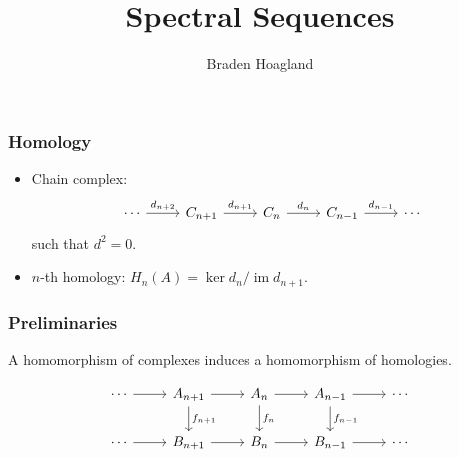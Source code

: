\documentclass{beamer}
\title{Spectral Sequences}
\author{Braden Hoagland}
\institute{Math 502: Algebraic Structures II}
\date{}
\DeclareMathOperator{\im}{im}
\begin{document}

\begin{frame}
	\titlepage
\end{frame}


\begin{frame}[fragile]
	\frametitle{Homology}

	\begin{itemize}
		\item Chain complex:
	\begin{equation*}
		\begin{tikzcd}
			\cdots\rar{d_{n+2}}&C_{n+1}\rar{d_{n+1}}&C_n\rar{d_n}&C_{n-1}\rar{d_{n-1}}&\cdots
		\end{tikzcd}
	\end{equation*}
	such that $d^{2}=0$.

		\item $n$-th homology: $H_{n}(A) = \ker d_n / \im d_{n+1}$.
	\end{itemize}
\end{frame}


\begin{frame}[fragile]
	\frametitle{Preliminaries}

	\begin{theorem}
		A homomorphism of complexes induces a homomorphism of homologies.
	\end{theorem}
	\[
	\begin{tikzcd}
		\cdots \rar & A_{n+1} \dar{f_{n+1}}\arrow[r] & A_n \arrow[r]\arrow[d,"f_n"] & A_{n-1} \arrow[r] \arrow[d,"f_{n-1}"]& \cdots \\
		\cdots \rar & B_{n+1} \arrow[r] & B_n \arrow[r] & B_{n-1} \arrow[r] & \cdots
	\end{tikzcd}
	\]
\end{frame}
\end{document}
